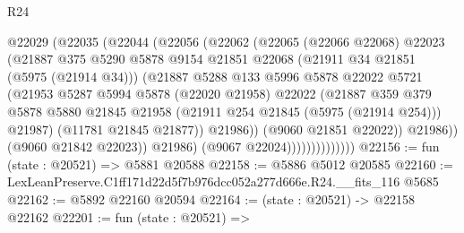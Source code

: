 \begin{lexlean}{R24}
\begin{coremodule}
                            @22029
                              (@22035
                                (@22044
                                  (@22056
                                    (@22062
                                      (@22065
                                        (@22066 @22068)
                                        @22023
                                        (@21887
                                          @375
                                          @5290
                                          @5878
                                          @9154
                                          @21851
                                          @22068
                                          (@21911 @34 @21851 (@5975 (@21914 @34)))
                                          (@21887
                                            @5288
                                            @133
                                            @5996
                                            @5878
                                            @22022
                                            @5721
                                            (@21953
                                              @5287
                                              @5994
                                              @5878
                                              (@22020 @21958)
                                              @22022
                                              (@21887
                                                @359
                                                @379
                                                @5878
                                                @5880
                                                @21845
                                                @21958
                                                (@21911 @254 @21845 (@5975 (@21914 @254)))
                                                @21987)
                                              (@11781 @21845 @21877))
                                            @21986))
                                        (@9060 @21851 @22022))
                                      @21986))
                                  (@9060 @21842 @22023))
                                @21986)
                              (@9067 @22024))))))))))))))
@22156 := fun (state : @20521) => @5881 @20588
@22158 := @5886 @5012 @20585
@22160 := LexLeanPreserve.C1ff171d22d5f7b976dcc052a277d666e.R24.__fits_116 @5685
@22162 := @5892 @22160 @20594
@22164 := (state : @20521) -> @22158 @22162
@22201 := fun (state : @20521) =>

\end{coremodule}
\end{lexlean}
